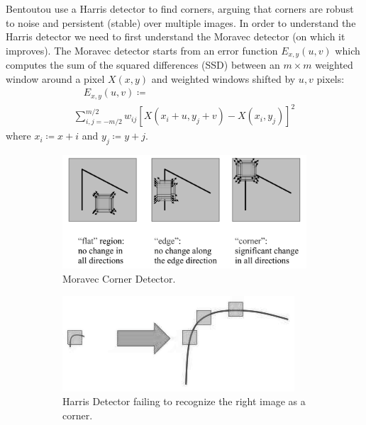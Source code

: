 Bentoutou \etal \cite{bentoutou2005automatic} use a Harris detector \cite{harris1988combined} to find corners, arguing that corners are robust to noise and persistent (stable) over multiple images.
%
In order to understand the Harris detector we need to first understand the Moravec \cite{moravec1980obstacle} detector (on which it improves).
%
The Moravec detector starts from an error function \(E_{x,y}(u,v)\) which computes the sum of the squared differences (SSD) between an \(m \times m\) weighted window around a pixel \(X(x, y)\) and weighted windows shifted by \(u,v\) pixels:
\begin{multline}
	\quad E_{x,y}(u,v) \coloneqq \\ \sum_{i,j=-m/2}^{m/2} w_{ij}\left[ X(x_i+ u,y_j+v) - X(x_i, y_j)\right]^2
	\label{moravecerrorfunction}
\end{multline}
where \(x_i \coloneqq x + i\) and \(y_j \coloneqq y+j\).
\begin{figure}[!htbp]
	\centering
	\newcommand{\subfigwidth}{.49\textwidth}
	\begin{subfigure}[b]{\subfigwidth}
		\centering
		\includegraphics[width=\linewidth,keepaspectratio]{figures/registration/corners.png}
		\caption{Moravec Corner Detector.}
		\label{fig:corners}
	\end{subfigure}
	\begin{subfigure}[b]{\subfigwidth}
		\centering
		\includegraphics[width=\linewidth,keepaspectratio]{figures/registration/sift/sift_scale_invariant.png}
		\caption{Harris Detector failing to recognize the right image as a corner.}
		\label{fig:sift_harris}
	\end{subfigure}
	\caption{}\label{fig:}
\end{figure}
